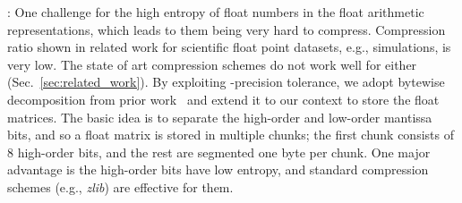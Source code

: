 \documentclass[conference]{IEEEtran}
\begin{document}


: 
One challenge for \weightstore\is the high entropy of float numbers in the float arithmetic representations, which leads to them being very hard to  compress. 
Compression ratio shown in related work for scientific float point datasets, e.g., simulations, is very low. 
The state of art compression schemes do not work well for \dnn\parameters either (Sec.~\ref{sec:related_work}).
By exploiting \dnn\low-precision tolerance, we adopt bytewise decomposition from prior work~\cite{schendel2012isobar,bhattacherjee2014pstore} and extend it to our context to store the float matrices. 
The basic idea is to separate the high-order and low-order mantissa bits, and so a float matrix is stored in multiple chunks; the first chunk consists of 8 high-order bits, and the rest are segmented one byte per chunk. 
One major advantage is the high-order bits have low entropy, and standard compression schemes (e.g., \emph{zlib}) are effective for them.
\end{document}
